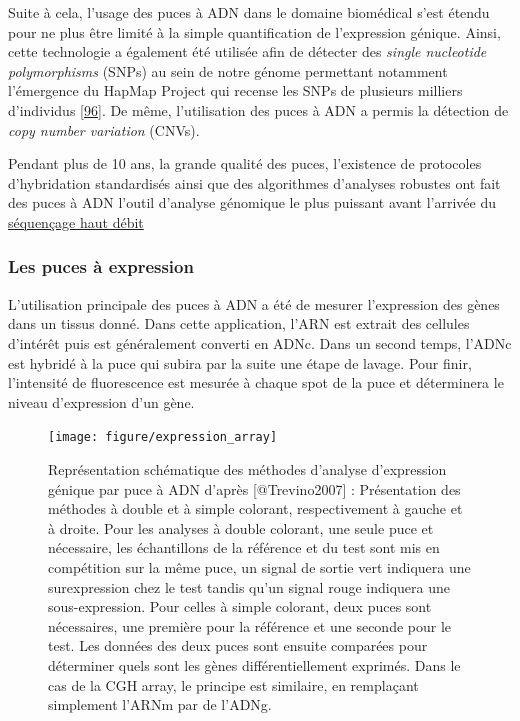 \documentclass[12pt,twoside]{ugathesis}
\theoremstyle{definition}
\theoremstyle{definition}
\theoremstyle{remark}
\begin{document}
Suite à cela, l'usage des puces à ADN dans le domaine biomédical s'est
étendu pour ne plus être limité à la simple quantification de
l'expression génique. Ainsi, cette technologie a également été utilisée
afin de détecter des \emph{single nucleotide polymorphisms} (SNPs) au
sein de notre génome permettant notamment l'émergence du HapMap Project
qui recense les SNPs de plusieurs milliers d'individus
{[}\protect\hyperlink{ref-Cutler2001}{96}{]}. De même, l'utilisation des
puces à ADN a permis la détection de \emph{copy number variation}
(CNVs).

Pendant plus de 10 ans, la grande qualité des puces, l'existence de
protocoles d'hybridation standardisés ainsi que des algorithmes
d'analyses robustes ont fait des puces à ADN l'outil d'analyse génomique
le plus puissant avant l'arrivée du \protect\hyperlink{ngs}{séquençage
haut débit}

\newpage

\subsubsection{Les puces à expression}\label{les-puces-a-expression}

L'utilisation principale des puces à ADN a été de mesurer l'expression
des gènes dans un tissus donné. Dans cette application, l'ARN est
extrait des cellules d'intérêt puis est généralement converti en ADNc.
Dans un second temps, l'ADNc est hybridé à la puce qui subira par la
suite une étape de lavage. Pour finir, l'intensité de fluorescence est
mesurée à chaque spot de la puce et déterminera le niveau d'expression
d'un gène.

\begin{figure}

{\centering \texttt{[image: figure/expression\_array]} 

}

\caption[Représentation schématique des méthodes d'analyse d'expression génique par puce à ADN]{Représentation schématique des méthodes d'analyse d'expression génique par puce à ADN d'après [@Trevino2007] : Présentation des méthodes à double et à simple colorant, respectivement à gauche et à droite. Pour les analyses à double colorant, une seule puce et nécessaire, les échantillons de la référence et du test sont mis en compétition sur la même puce, un signal de sortie vert indiquera une surexpression chez le test tandis qu'un signal rouge indiquera une sous-expression. Pour celles à simple colorant, deux puces sont nécessaires, une première pour la référence et une seconde pour le test. Les données des deux puces sont ensuite comparées pour déterminer quels sont les gènes différentiellement exprimés. Dans le cas de la CGH array, le principe est similaire, en remplaçant simplement l'ARNm par de l'ADNg.}\label{fig:figexparray}
\end{figure}
\end{document}
